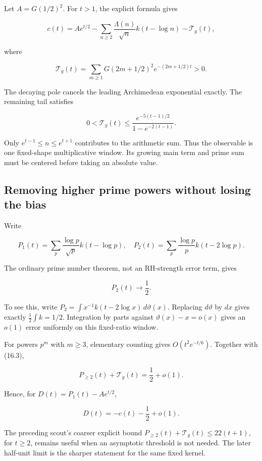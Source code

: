 \documentclass[
  10pt,
  a4paper,
  10pt,
  oneside,
  openany]{book}
\begin{document}
Let \(A=G(1/2)^2\). For \(t>1\), the explicit formula gives

\[
c(t)=Ae^{t/2}
-\sum_{n\ge2}\frac{\Lambda(n)}{\sqrt n}k(t-\log n)
-\mathcal T_g(t),
\tag{16.1}\label{eq:16.1}
\]

where

\[
\mathcal T_g(t)=\sum_{m\ge1}
G(2m+1/2)^2e^{-(2m+1/2)t}>0.
\tag{16.2}\label{eq:16.2}
\]

The decaying pole cancels the leading Archimedean exponential exactly.
The remaining tail satisfies

\[
0<\mathcal T_g(t)
\le\frac{e^{-5(t-1)/2}}{1-e^{-2(t-1)}}.
\tag{16.3}\label{eq:16.3}
\]

Only \(e^{t-1}\le n\le e^{t+1}\) contributes to the arithmetic sum. Thus
the observable is one fixed-shape multiplicative window. Its growing
main term and prime sum must be centered before taking an absolute
value.

\subsection{Removing higher prime powers without losing the
bias}\label{removing-higher-prime-powers-without-losing-the-bias}

Write

\[
P_1(t)=\sum_p\frac{\log p}{\sqrt p}k(t-\log p),
\quad
P_2(t)=\sum_p\frac{\log p}{p}k(t-2\log p).
\tag{16.4}\label{eq:16.4}
\]

The ordinary prime number theorem, not an RH-strength error term, gives

\[
P_2(t)\longrightarrow\frac12.
\tag{16.5}\label{eq:16.5}
\]

To see this, write \(P_2=\int x^{-1}k(t-2\log x)\,d\vartheta(x)\).
Replacing \(d\vartheta\) by \(dx\) gives exactly \(\frac12\int k=1/2\).
Integration by parts against \(\vartheta(x)-x=o(x)\) gives an \(o(1)\)
error uniformly on this fixed-ratio window.

For powers \(p^m\) with \(m\ge3\), elementary counting gives
\(O(t^2e^{-t/6})\). Together with (16.3),

\[
P_{\ge2}(t)+\mathcal T_g(t)=\frac12+o(1).
\tag{16.6}\label{eq:16.6}
\]

Hence, for \(D(t)=P_1(t)-Ae^{t/2}\),

\[
D(t)=-c(t)-\frac12+o(1).
\tag{16.7}\label{eq:16.7}
\]

The preceding scout's coarser explicit bound
\(P_{\ge2}(t)+\mathcal T_g(t)\le22(t+1)\), for \(t\ge2\), remains useful
when an asymptotic threshold is not needed. The later half-unit limit is
the sharper statement for the same fixed kernel.
\end{document}
